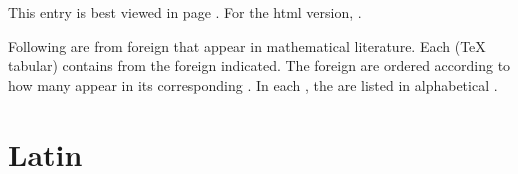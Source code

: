 \documentclass[12pt]{article}
\begin{document}

This entry is best viewed in page .  For the html version, .

Following are  from foreign  that appear in mathematical literature.  Each  (TeX  tabular) contains  from the foreign  indicated.  The foreign  are ordered according to how many  appear in its corresponding .  In each , the  are listed in alphabetical .

\section{Latin}
\end{document}
